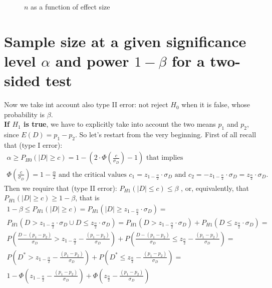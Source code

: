 \documentclass[14pt]{article}
\begin{document}
\begin{figure}[h!]
\begin{minipage}{0.31\textwidth}
\end{minipage}
\caption{$n$ as a function of effect size}
\label{fig:sample size alpha}
\end{figure}

\section{Sample size at a given significance level $\alpha$ and power $1-\beta$ for a two-sided test}
Now we take int account also type II error: not reject $H_{0}$ when it is false, whose probability is $\beta$. \\\textbf{If $H_{1}$ is true}, we have to explicitly take into account the two means $p_{1}$ and $p_{2}$, since $E(D)=p_{1}- p_{2}$. So let's restart from the very beginning. First of all recall that (type I error):
\begin{equation}
\begin{split}
 \alpha\geq P_{H{0}} (\left | D \right |\geq c)=1-\left (2\cdot\Phi\left ( \frac{c}{\sigma_{D}}\right ) -1\right ) \text{ that implies }\\
\Phi\left ( \frac{c}{\sigma_{D}}\right ) =1-\frac{\alpha}{2}\text{ and the critical values }
c_{1}=z_{1-\frac{\alpha}{2}}\cdot\sigma_{D} \text{ and } c_{2}=-z_{1-\frac{\alpha}{2}}\cdot\sigma_{D}= z_{\frac{\alpha}{2}}\cdot\sigma_{D}.
\end{split}\end{equation}\newline
Then we require that (type II error): $P_{H{1}} (\left | D \right |\leq c) \leq \beta$ , or, equivalently, that $ P_{H{1}} (\left | D \right |\geq c) \geq 1-\beta$, that is
\begin{equation}
 \begin{split}
1-\beta\leq P_{H{1}} (\left | D \right |\geq c) = P_{H{1}} (\left | D \right |\geq  z_{1-\frac{\alpha}{2}}\cdot\sigma_{D}) = \\
P_{H{1}} \left (D>  z_{1-\frac{\alpha}{2}}\cdot\sigma_{D} \cup D\leq  z_{\frac{\alpha}{2}}\cdot\sigma_{D} \right ) = 
P_{H{1}} \left (D>  z_{1-\frac{\alpha}{2}}\cdot\sigma_{D}\right )  + P_{H{1}} \left (D\leq  z_{\frac{\alpha}{2}}\cdot\sigma_{D}\right ) =\\
P\left (\frac{D-(p_{1}- p_{2})}{\sigma_{D} } >z_{1-\frac{\alpha}{2}} - \frac{(p_{1}- p_{2})}{\sigma_{D}} \right )+
P\left (\frac{D-(p_{1}- p_{2})}{\sigma_{D} } \leq z_{\frac{\alpha}{2}}-\frac{(p_{1}- p_{2})}{\sigma_{D}} \right )=\\
P\left (D^{*}>z_{1-\frac{\alpha}{2}}-\frac{(p_{1}- p_{2})}{\sigma_{D}} \right )+
P\left (D^{*} \leq z_{\frac{\alpha}{2}}-\frac{(p_{1}- p_{2})}{\sigma_{D}}   \right )=\\
1-\Phi\left (z_{1-\frac{\alpha}{2}}- \frac{(p_{1}- p_{2})}{\sigma_{D}} \right )+\Phi\left ( z_{\frac{\alpha}{2}}-\frac{(p_{1}- p_{2})}{\sigma_{D}} \right )
 \end{split}
\end{equation}
\end{document}
